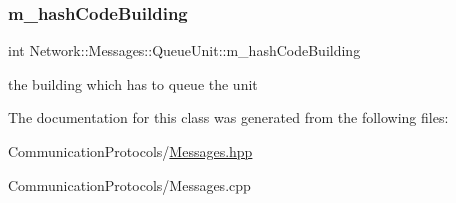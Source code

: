\subsubsection{\texorpdfstring{m\+\_\+hash\+Code\+Building}{m\_hashCodeBuilding}}
{\footnotesize\ttfamily int Network\+::\+Messages\+::\+Queue\+Unit\+::m\+\_\+hash\+Code\+Building}

the building which has to queue the unit 

The documentation for this class was generated from the following files\+:\begin{DoxyCompactItemize}
\item 
Communication\+Protocols/\hyperlink{_messages_8hpp}{Messages.\+hpp}\item 
Communication\+Protocols/Messages.\+cpp\end{DoxyCompactItemize}
